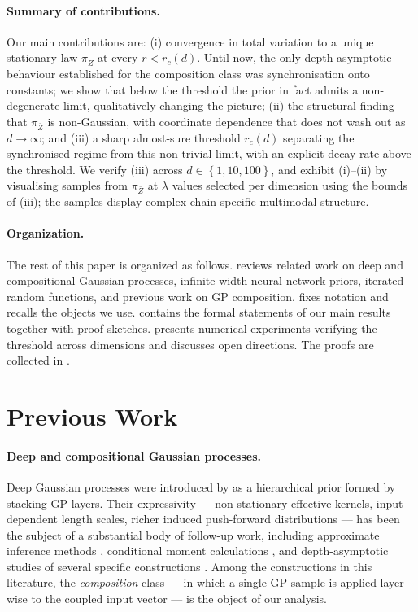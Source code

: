 \documentclass{article}
\newcommand{\Set}[1]{\left\{ #1 \right\}}
\newcommand{\bZ}{\bar{Z}}
\begin{document}
\paragraph{Summary of contributions.}
Our main contributions are: (i) convergence in total variation to a unique stationary law $\pi_{\bZ}$ at every $r < r_c(d)$. Until now, the only depth-asymptotic behaviour established for the composition class was synchronisation onto constants; we show that below the threshold the prior in fact admits a non-degenerate limit, qualitatively changing the picture; (ii) the structural finding that $\pi_{\bZ}$ is non-Gaussian, with coordinate dependence that does not wash out as $d \to \infty$; and (iii) a sharp almost-sure threshold $r_c(d)$ separating the synchronised regime from this non-trivial limit, with an explicit decay rate above the threshold. We verify (iii) across $d \in \Set{1, 10, 100}$, and exhibit (i)--(ii) by visualising samples from $\pi_{\bZ}$ at $\lambda$ values selected per dimension using the bounds of (iii); the samples display complex chain-specific multimodal structure.

\paragraph{Organization.}
The rest of this paper is organized as follows.  reviews related work on deep and compositional Gaussian processes, infinite-width neural-network priors, iterated random functions, and previous work on GP composition.  fixes notation and recalls the objects we use.  contains the formal statements of our main results together with proof sketches.  presents numerical experiments verifying the threshold across dimensions and  discusses open directions. The  proofs are collected in .

\section{Previous Work}
\label{sec:previous_work}

\paragraph{Deep and compositional Gaussian processes.}
Deep Gaussian processes were introduced by \citet{damianou2013deep} as a hierarchical prior formed by stacking GP layers. Their expressivity --- non-stationary effective kernels, input-dependent length scales, richer induced push-forward distributions --- has been the subject of a substantial body of follow-up work, including approximate inference methods \citep{bui2016deep,salimbeni2017doubly,cutajar2017random,havasi2018inference}, conditional moment calculations \citep{lu2019interpretable}, and depth-asymptotic studies of several specific constructions \citep{duvenaud2014avoiding,dunlop2018how}. Among the constructions in this literature, the \emph{composition} class --- in which a single GP sample is applied layer-wise to the coupled input vector --- is the object of our analysis.
\end{document}
